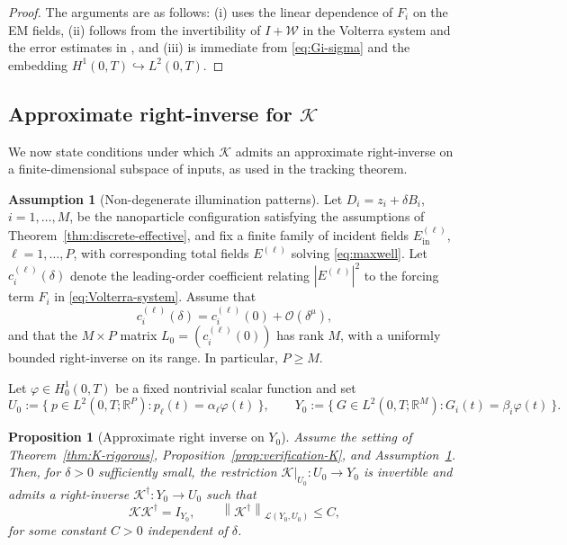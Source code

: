 \documentclass[11pt,a4paper]{article}
\numberwithin{equation}{section}
\newtheorem{proposition}[theorem]{Proposition}
\theoremstyle{definition}
\newtheorem{assumption}[theorem]{Assumption}
\newcommand{\R}{\mathbb{R}}
\newcommand{\1}{\mathbbm{1}}
\newcommand{\norm}[1]{\left\| #1 \right\|}
\begin{document}
\begin{proof}
The arguments are as follows: (i) uses the linear dependence
of $F_i$ on the EM fields, (ii) follows from the invertibility of
$I+\mathcal{W}$ in the Volterra system and the error estimates in
\cite{CaoMukherjeeSini2025}, and (iii) is immediate from
\eqref{eq:Gi-sigma} and the embedding $H^1(0,T)\hookrightarrow L^2(0,T)$.
\end{proof}

\subsection{Approximate right-inverse for \texorpdfstring{$\mathcal{K}$}{K}}\label{sec:K-inverse}
\noindent
We now state conditions under which $\mathcal{K}$ admits an approximate
right-inverse on a finite-dimensional subspace of inputs, as used in the
tracking theorem.

\begin{assumption}[Non-degenerate illumination patterns]
\label{ass:illumination}
Let $D_i=z_i+\delta B_i$, $i=1,\dots,M$, be the nanoparticle configuration
satisfying the assumptions of Theorem~\ref{thm:discrete-effective}, and fix
a finite family of incident fields $E^{(\ell)}_{\mathrm{in}}$,
$\ell=1,\dots,P$, with corresponding total fields $E^{(\ell)}$ solving
\eqref{eq:maxwell}. Let $c_i^{(\ell)}(\delta)$ denote the leading-order
coefficient relating $|E^{(\ell)}|^2$ to the forcing term $F_i$ in
\eqref{eq:Volterra-system}. Assume that
\[
c_i^{(\ell)}(\delta) = c_i^{(\ell)}(0) + \mathcal{O}(\delta^\mu),
\]
and that the $M\times P$ matrix $L_0=(c_i^{(\ell)}(0))$ has rank $M$, with
a uniformly bounded right-inverse on its range. In particular, $P\ge M$.
\end{assumption}
\noindent
Let $\varphi\in H^1_0(0,T)$ be a fixed nontrivial scalar function and set
\[
U_0 := \{\ p\in L^2(0,T;\R^P): p_\ell(t)=\alpha_\ell\varphi(t)\ \},
\qquad
Y_0 := \{\ G\in L^2(0,T;\R^M): G_i(t)=\beta_i\varphi(t)\ \}.
\]

\begin{proposition}[Approximate right inverse on $Y_0$]
\label{prop:K-right-inverse}
Assume the setting of Theorem~\ref{thm:K-rigorous},
Proposition~\ref{prop:verification-K}, and Assumption~\ref{ass:illumination}.
Then, for $\delta>0$ sufficiently small, the restriction
$\mathcal{K}|_{U_0}:U_0\to Y_0$ is invertible and admits a right-inverse
$\mathcal{K}^\dagger:Y_0\to U_0$ such that
\[
\mathcal{K}\mathcal{K}^\dagger = I_{Y_0},\qquad
\norm{\mathcal{K}^\dagger}_{\mathcal{L}(Y_0,U_0)} \le C,
\]
for some constant $C>0$ independent of $\delta$.
\end{proposition}
\end{document}
